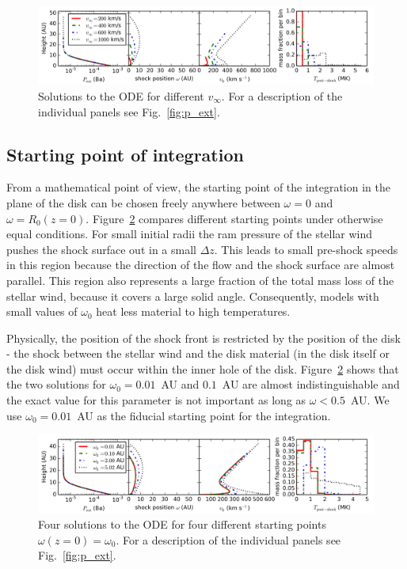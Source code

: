 \documentclass{emulateapj}
\begin{document}
\begin{figure}[h!]
\begin{center}
\includegraphics[width=1\columnwidth]{figures/v_infty/v_infty.png}
\caption{\label{fig:v_infty}
Solutions to the ODE for different $v_\infty$. For a description of the individual panels see Fig.~\ref{fig:p_ext}.}
\end{center}
\end{figure}

\subsection{Starting point of integration}
\label{sect:omega0}
From a mathematical point of view, the starting point of the integration in the plane of the disk can be chosen freely anywhere between $\omega=0$ and $\omega=R_0(z=0)$. Figure~\ref{fig:omega_0} compares different starting points under otherwise equal conditions. For small initial radii the ram pressure of the stellar wind pushes the shock surface out in a small $\Delta z$. This leads to small pre-shock speeds in this region because the direction of the flow and the shock surface are almost parallel. This region also represents a large fraction of the total mass loss of the stellar wind, because it covers a large solid angle. Consequently, models with small values of $\omega_0$ heat less material to high temperatures. 

Physically, the position of the shock front is restricted by the position of the disk - the shock between the stellar wind and the disk material (in the disk itself or the disk wind) must occur within the inner hole of the disk. Figure~\ref{fig:omega_0} shows that the two solutions for $\omega_0=0.01$~AU and $0.1$~AU are almost indistinguishable and the exact value for this parameter is not important as long as $\omega < 0.5$~AU. We use $\omega_0 = 0.01$~AU as the fiducial starting point for the integration.

\begin{figure}[h!]
\begin{center}
\includegraphics[width=1\columnwidth]{figures/omega_0/omega_0.png}
\caption{\label{fig:omega_0}
Four solutions to the ODE for four different starting points $\omega(z=0)=\omega_0$. For a description of the individual panels see Fig.~\ref{fig:p_ext}.}
\end{center}
\end{figure}
\end{document}
